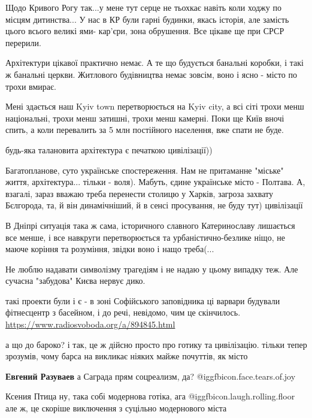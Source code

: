 \begin{itemize}

Щодо Кривого Рогу так...у мене тут серце не тьохкає навіть коли ходжу по місцям
дитинства... У нас в КР були гарні будинки, якась історія, але замість цього
всього великі ями- кар'єри, зона обрушення. Все цікаве ще при СРСР перерили.

Архітектури цікавої практично немає. А те що будується банальні коробки, і такі
ж банальні церкви. Житлового будівництва немає зовсім, воно і ясно - місто по
трохи вмирає.



Мені здається наш Kyiv town перетворюється на Kyiv city, а всі сіті трохи менш
національні, трохи менш затишні, трохи менш камерні. Поки ще Київ вночі спить,
а коли перевалить за 5 млн постійного населення, вже спати не буде.


будь-яка талановита архітектура є печаткою цивілізації))

Багатопланове, суто українське спостереження. Нам не притаманне "міське" життя, архітектура... тільки - воля). Мабуть, єдине українське місто - Полтава. А, взагалі, зараз вважаю треба перенести столицю у Харків, загроза захвату Бєлгорода, та, й він динамічніший, й в сенсі просування, не буду тут) цивілізації

В Дніпрі ситуація така ж сама, історичного славного Катеринославу лишається все менше, і все навкруги перетворюється та урбаністично-безлике ніщо, не маюче коріння та розуміння, звідки воно і нащо треба(...

Не люблю надавати символізму трагедіям і не надаю у цьому випадку теж. Але сучасна "забудова" Києва нервує дико.

такі проекти були і є - в зоні Софійського заповідника ці варвари будували фітнесцентр з басейном, і до речі, невідомо, чим це скінчилось. \url{https://www.radiosvoboda.org/a/894845.html}


а що до бароко? і так, це ж дійсно просто про готику та цивілізацію. тільки
тепер зрозумів, чому барса на викликає ніяких майже почуттів, як місто

\begin{itemize} %
\textbf{Евгений Разуваев} а Саграда прям соцреализм, да? @igg{fbicon.face.tears.of.joy} 

Ксения Птица ну, така собі модернова готіка, ага  @igg{fbicon.laugh.rolling.floor}  але ж, це скоріше виключення з суцільно модернового міста


\end{itemize}
\end{itemize}
